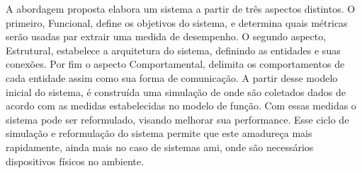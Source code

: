 A abordagem proposta elabora um sistema a partir de três aspectos distintos. O primeiro, Funcional, define os objetivos do sistema, e determina quais métricas serão usadas par extrair uma medida de desempenho. O segundo aspecto, Estrutural, estabelece a arquitetura do sistema, definindo as entidades e suas conexões. Por fim o aspecto Comportamental, delimita os comportamentos de cada entidade assim como sua forma de comunicação. A partir desse modelo inicial do sistema, é construída uma simulação de onde são coletados dados de acordo com as medidas estabelecidas no modelo de função. Com essas medidas o sistema pode ser reformulado, visando melhorar sua performance. 
Esse ciclo de simulação e reformulação do sistema permite que este amadureça mais rapidamente, ainda mais no caso de sistemas \acrshort{ami}, onde são necessários dispositivos físicos no ambiente. 
    

    
    
    
 

